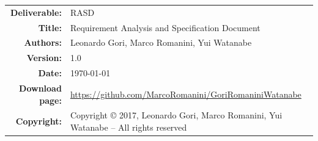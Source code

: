 \begin{table}[H]
    \setlength\arrayrulewidth{1pt}
    \centering
    \begin{tabular}{rl}
        \hline
        \textbf{Deliverable:} & RASD\\
        \textbf{Title:} & Requirement Analysis and Specification Document \\
        \textbf{Authors:} & Leonardo Gori, Marco Romanini, Yui Watanabe \\
        \textbf{Version:} & 1.0 \\ 
        \textbf{Date:} & \today \\
        \textbf{Download page:} & \url{https://github.com/MarcoRomanini/GoriRomaniniWatanabe} \\
        \textbf{Copyright:} & Copyright © 2017, Leonardo Gori, Marco Romanini, Yui Watanabe – All rights reserved \\
        \hline
    \end{tabular}
\end{table}

\setcounter{page}{2}


\newpage
{}
\tableofcontents
\newpage
{}
\listoffigures
{}
\listoftables

\clearpage
{}
\label{sect:introduction}


\clearpage
{}
\label{sect:overview}


\clearpage
{}
\label{sect:requirements}


